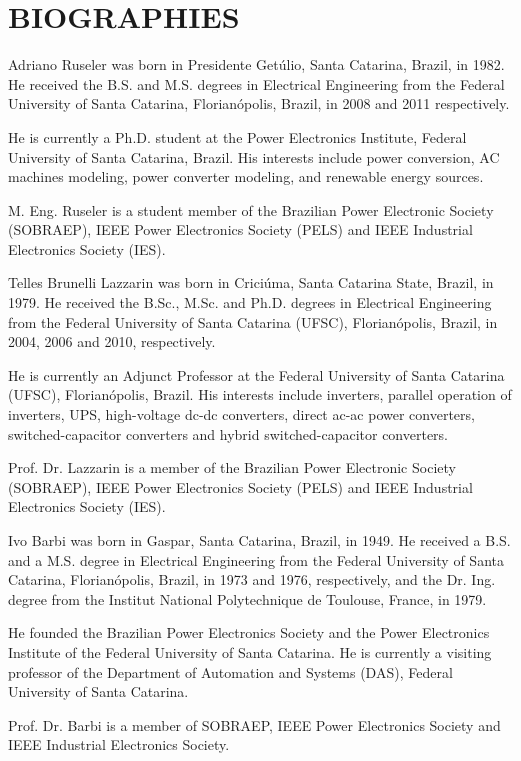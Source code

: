 
\section*{BIOGRAPHIES}

\begin{biography}{Adriano Ruseler}
was born in Presidente Getúlio, Santa Catarina, Brazil, in 1982. He received the B.S. and M.S. degrees in Electrical Engineering from 
the Federal University of Santa Catarina, Florianópolis, Brazil,  in 2008 and 2011 respectively.

He is currently a Ph.D. student at the Power Electronics Institute, Federal University of Santa Catarina, Brazil. His interests include power conversion, AC machines modeling, power converter modeling, and renewable energy sources.

M. Eng. Ruseler is a student member of the Brazilian Power Electronic Society (SOBRAEP), IEEE Power Electronics Society (PELS) and IEEE Industrial Electronics Society (IES).
\end{biography}


\begin{biography}{Telles Brunelli Lazzarin}
was born in Criciúma, Santa Catarina State, Brazil, in 1979. He received the B.Sc., M.Sc. and Ph.D. degrees in Electrical Engineering from the Federal University of Santa Catarina (UFSC), Florian\'opolis, Brazil, in 2004, 2006 and 2010, respectively.

He is currently an Adjunct Professor at the Federal University of Santa Catarina (UFSC), Florianópolis, Brazil.  His interests include inverters, parallel operation of inverters, UPS, high-voltage dc-dc converters, direct ac-ac power converters, switched-capacitor converters and hybrid switched-capacitor converters.

Prof. Dr. Lazzarin is a member of the Brazilian Power Electronic Society (SOBRAEP), IEEE Power Electronics Society (PELS) and IEEE Industrial
Electronics Society (IES). 
\end{biography}


\begin{biography}{Ivo Barbi} was born in Gaspar, Santa Catarina, Brazil, in 1949. He received a B.S. and a M.S. degree in Electrical Engineering from the Federal University of Santa Catarina, Florianópolis, Brazil, in 1973 and 1976, respectively, and the Dr. Ing. degree from the Institut National Polytechnique de Toulouse, France, in 1979.

He founded the Brazilian Power Electronics Society and the Power Electronics Institute of the Federal University of Santa Catarina.
He is currently a visiting professor of the Department of Automation and Systems (DAS), Federal University of Santa Catarina.

Prof. Dr. Barbi is a member of SOBRAEP, IEEE Power Electronics Society and IEEE Industrial Electronics Society.
\end{biography}



